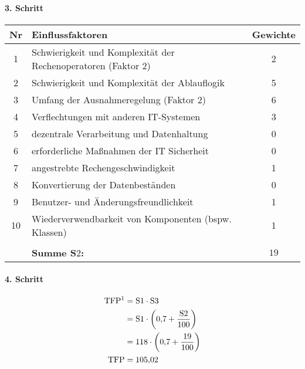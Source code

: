 \begin{landscape}
\begin{minipage}{0.7\textwidth}
		\paragraph{3. Schritt}
		\begin{center}
			\begin{tabular}{|c|l|c|}
				\hline
				Nr & Einflussfaktoren & Gewichte\\
				\hline
				1 & Schwierigkeit und Komplexität der Rechenoperatoren (Faktor 2) & 2\\
				2 & Schwierigkeit und Komplexität der Ablauflogik & 5\\
				3 & Umfang der Ausnahmeregelung (Faktor 2) & 6\\
				4 & Verflechtungen mit anderen IT-Systemen & 3\\
				5 & dezentrale Verarbeitung und Datenhaltung & 0\\
				6 & erforderliche Maßnahmen der IT Sicherheit & 0\\
				7 & angestrebte Rechengeschwindigkeit & 1\\
				8 & Konvertierung der Datenbeständen & 0\\
				9 & Benutzer- und Änderungsfreundlichkeit & 1\\
				10 & Wiederverwendbarkeit von Komponenten (bspw. Klassen) & 1\\
				\hline
				\multicolumn{3}{c}{}\\
				\cline{2-3}
			    \multicolumn{1}{c}{} & \multicolumn{1}{|l|}{{\bf Summe S$2$:}} & $19$\\
				\cline{2-3} 
			\end{tabular}
		\end{center}
	\end{minipage}
\end{landscape}

\paragraph{4. Schritt}
\begin{align*}
	\text{TFP\footnotemark} &= \text{S}1 \cdot \text{S}3\\
			   &= \text{S}1 \cdot \left(0{,}7 + \frac{\text{S}2}{100}\right)\\
			   &= 118 \cdot \left( 0{,}7 + \frac{19}{100}\right)\\
	\text{TFP} &= 105{,}02\\
\end{align*}

